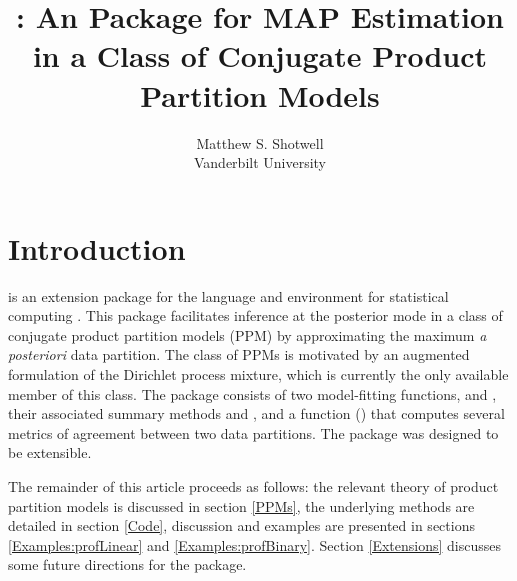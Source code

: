 \documentclass[article, nojss]{jss}
\author{Matthew S. Shotwell\\Vanderbilt University}
\title{\pkg{profdpm}: An \proglang{R} Package for MAP Estimation in a Class of Conjugate Product Partition Models}
\begin{document}
\section[Intro]{Introduction}
 is an extension package for the  language and environment for statistical computing \citep{R2011}. This package facilitates inference at the posterior mode in a class of conjugate product partition models (PPM) by approximating the maximum {\it a posteriori} data partition. The class of PPMs is motivated by an augmented formulation of the Dirichlet process mixture, which is currently the only available member of this class. The  package consists of two model-fitting functions,  and , their associated summary methods  and , and a function () that computes several metrics of agreement between two data partitions. The  package was designed to be extensible.

The remainder of this article proceeds as follows: the relevant theory of product partition models is discussed in section \ref{PPMs}, the underlying  methods are detailed in section \ref{Code}, discussion and examples are presented in sections \ref{Examples:profLinear} and \ref{Examples:profBinary}. Section \ref{Extensions} discusses some future directions for the  package.\\
\end{document}
